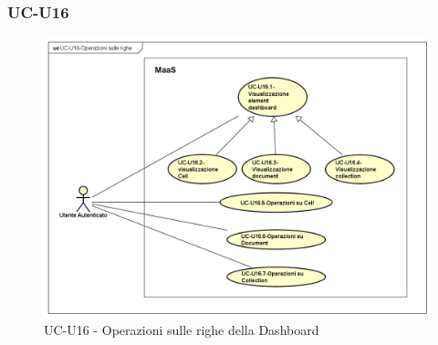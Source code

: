\subsubsection{UC-U16}

    \begin{figure}[H]
      \begin{center}
        \includegraphics[width=12cm]{res/img/UCUtenti/UCUtenteA/UC-U16-Operazioni_sulle_righe/UC-U16-Operazioni_sulle_righe}
      \caption{UC-U16 - Operazioni sulle righe della Dashboard}
      \end{center} 
    \end{figure}

